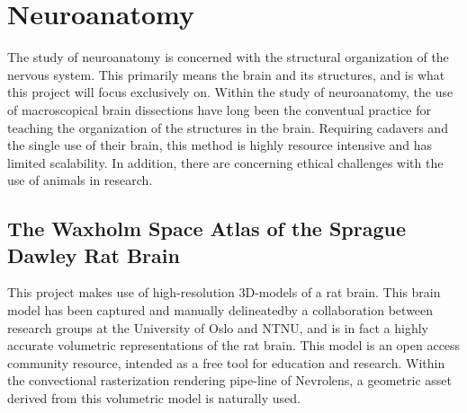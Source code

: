 \section{Neuroanatomy}

The study of neuroanatomy is concerned with the structural organization of the nervous system. This primarily means the brain and its structures, and is what this project will focus exclusively on.
Within the study of neuroanatomy, the use of macroscopical brain dissections have long been the conventual practice for teaching the organization of the structures in the brain. Requiring cadavers and the single use of their brain, this method is highly resource intensive and has limited scalability. In addition, there are concerning ethical challenges with the use of animals in research. 


\subsection*{The Waxholm Space Atlas of the Sprague Dawley Rat Brain}\label{chap:ratbrain}




This project makes use of high-resolution 3D-models of a rat brain. This brain model has been captured and manually delineated\footnotemark[1] by a collaboration between research groups at the University of Oslo and NTNU, and is in fact a highly accurate volumetric representations of the rat brain. This model is an open access community resource, intended as a free tool for education and research\footnotemark[2]. Within the convectional rasterization rendering pipe-line of Nevrolens, a geometric asset derived from this volumetric model is naturally used. 

